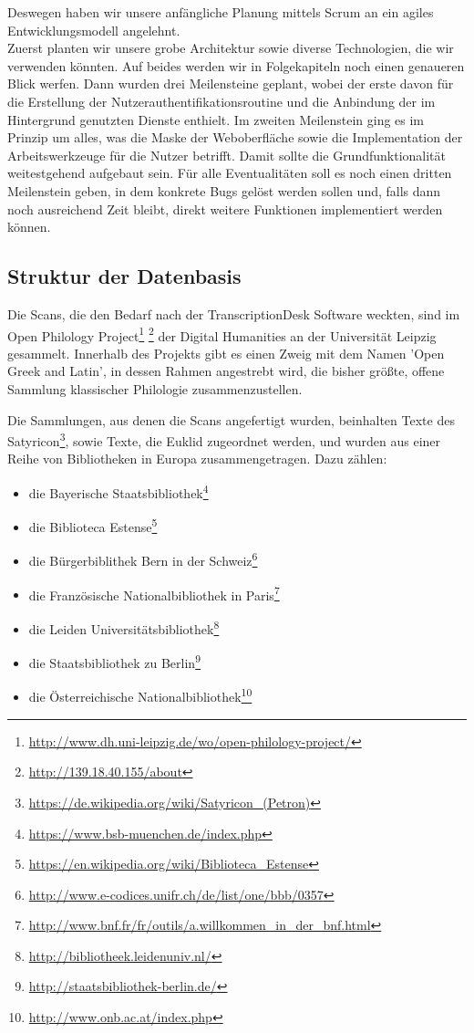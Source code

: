 \documentclass{article}
\begin{document}
Deswegen haben wir unsere anfängliche Planung mittels Scrum an ein agiles Entwicklungsmodell angelehnt.\\
Zuerst planten wir unsere grobe Architektur sowie diverse Technologien, die wir verwenden könnten.
Auf beides werden wir in Folgekapiteln noch einen genaueren Blick werfen. Dann wurden drei Meilensteine geplant,
wobei der erste davon für die Erstellung der Nutzerauthentifikationsroutine und die Anbindung der im Hintergrund genutzten Dienste enthielt.
Im zweiten Meilenstein ging es im Prinzip um alles, was die Maske der Weboberfläche sowie die Implementation der Arbeitswerkzeuge für die Nutzer betrifft.
Damit sollte die Grundfunktionalität weitestgehend aufgebaut sein. Für alle Eventualitäten soll es noch einen dritten Meilenstein geben,
in dem konkrete Bugs gelöst werden sollen und, falls dann noch ausreichend Zeit bleibt, direkt weitere Funktionen implementiert werden können.
\subsection{Struktur der Datenbasis}
Die Scans, die den Bedarf nach der TranscriptionDesk Software weckten,
sind im Open Philology Project\footnote{
    \url{http://www.dh.uni-leipzig.de/wo/open-philology-project/}}
    \footnote{
    \url{http://139.18.40.155/about}}
    der Digital Humanities an der Universität Leipzig gesammelt.
Innerhalb des Projekts gibt es einen Zweig mit dem Namen 'Open Greek and Latin', in dessen Rahmen angestrebt wird,
die bisher größte, offene Sammlung klassischer Philologie zusammenzustellen.

Die Sammlungen, aus denen die Scans angefertigt wurden, beinhalten Texte des Satyricon\footnote{\url{https://de.wikipedia.org/wiki/Satyricon_(Petron)}},
sowie Texte, die Euklid zugeordnet werden,
und wurden aus einer Reihe von Bibliotheken in Europa zusammengetragen. Dazu zählen:
\begin{itemize}
\item die Bayerische Staatsbibliothek\footnote{\url{https://www.bsb-muenchen.de/index.php}}
\item die Biblioteca Estense\footnote{\url{https://en.wikipedia.org/wiki/Biblioteca_Estense}}
\item die Bürgerbiblithek Bern in der Schweiz\footnote{\url{http://www.e-codices.unifr.ch/de/list/one/bbb/0357}}
\item die Französische Nationalbibliothek in Paris\footnote{\url{http://www.bnf.fr/fr/outils/a.willkommen_in_der_bnf.html}}
\item die Leiden Universitätsbibliothek\footnote{\url{http://bibliotheek.leidenuniv.nl/}}
\item die Staatsbibliothek zu Berlin\footnote{\url{http://staatsbibliothek-berlin.de/}}
\item die Österreichische Nationalbibliothek\footnote{\url{http://www.onb.ac.at/index.php}}
\end{itemize}
\end{document}
